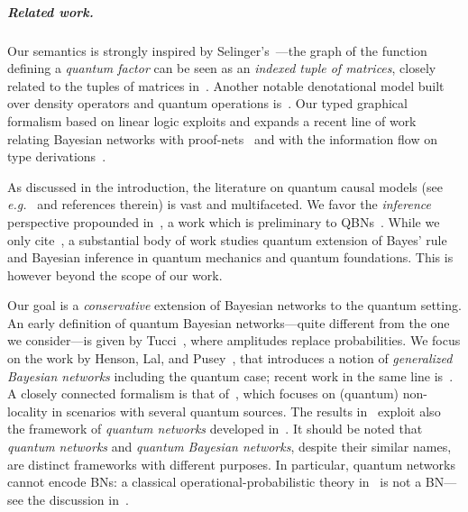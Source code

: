 \documentclass[10pt,a4paper]{article}
\newcommand*{\eg}{\emph{e.g.}\xspace}
\newcommand{\pns}{proof-nets\xspace}
\begin{document}
\subparagraph{Related work.}

Our semantics is strongly inspired by Selinger's~\cite{Selinger2004}---the graph of the function defining a \emph{quantum factor} can be seen as an \emph{indexed tuple of matrices}, closely related to the tuples of matrices in~\cite{Selinger2004}.
Another notable denotational model built over density operators and quantum operations is~\cite{HasuoH17}.
Our typed graphical formalism based on linear logic exploits and expands a recent line of work relating Bayesian networks with \pns~\cite{EhrhardFP23,BPN} and with the information flow on type derivations~\cite{popl24}. 

As discussed in the introduction, the literature on quantum causal models (see \eg~\cite{BarrettLorenzOreshkov2019} and references therein) is vast and multifaceted.
We favor the \emph{inference} perspective propounded in~\cite{LeiferSpekkens2013}, a work which is preliminary to QBNs~\cite{GBN2014}.
While we only cite~\cite{LeiferSpekkens2013}, a substantial body of work studies quantum extension of Bayes' rule and Bayesian inference in quantum mechanics and quantum foundations.
This is however beyond the scope of our work.

Our goal is a \emph{conservative} extension of Bayesian networks to the quantum setting.
An early definition of quantum Bayesian networks---quite different from the one we consider---is given by Tucci~\cite{Tucci1995}, where amplitudes replace probabilities.
We focus on the work by Henson, Lal, and Pusey~\cite{GBN2014}, that introduces a notion of \emph{generalized Bayesian networks} including the quantum case; recent work in the same line is~\cite{KhannaAnsanelliPuseyWolfe2024}.
A closely connected formalism is that of~\cite{Fritz2012}, which focuses on (quantum) non-locality in scenarios with several quantum sources.
The results in~\cite{GBN2014} exploit also the framework of \emph{quantum networks} developed in~\cite{10.1103/PhysRevA.80.022339}.
It should be noted that \emph{quantum networks} and \emph{quantum Bayesian networks}, despite their similar names, are distinct frameworks with different purposes.
In particular, quantum networks cannot encode BNs: a classical operational-probabilistic theory in~\cite{10.1103/PhysRevA.80.022339} is not a BN---see the discussion in~\cite[Section~3.1 and Example~10]{GBN2014}.
\end{document}
